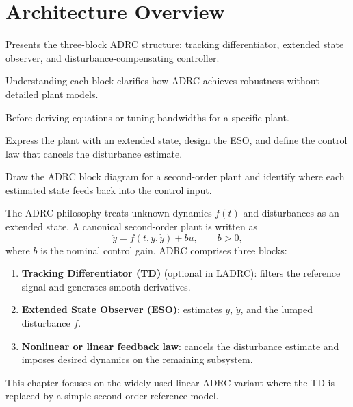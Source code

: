 \section{Architecture Overview}
\begin{beginnerguide}
    \item[\textbf{What?}] Presents the three-block ADRC structure: tracking differentiator, extended state observer, and disturbance-compensating controller.
    \item[\textbf{Why?}] Understanding each block clarifies how ADRC achieves robustness without detailed plant models.
    \item[\textbf{When?}] Before deriving equations or tuning bandwidths for a specific plant.
    \item[\textbf{How?}] Express the plant with an extended state, design the ESO, and define the control law that cancels the disturbance estimate.
    \item[\textbf{Example}] Draw the ADRC block diagram for a second-order plant and identify where each estimated state feeds back into the control input.
\end{beginnerguide}
The ADRC philosophy treats unknown dynamics $f(t)$ and disturbances as an extended state. A canonical second-order plant is written as
\begin{equation}
    \ddot{y} = f(t, y, \dot{y}) + b u, \qquad b > 0,
    \label{eq:adrc-plant}
\end{equation}
where $b$ is the nominal control gain. ADRC comprises three blocks:
\begin{enumerate}[leftmargin=*]
    \item \textbf{Tracking Differentiator (TD)} (optional in LADRC): filters the reference signal and generates smooth derivatives.
    \item \textbf{Extended State Observer (ESO)}: estimates $y$, $\dot{y}$, and the lumped disturbance $f$.
    \item \textbf{Nonlinear or linear feedback law}: cancels the disturbance estimate and imposes desired dynamics on the remaining subsystem.
\end{enumerate}
This chapter focuses on the widely used linear ADRC variant where the TD is replaced by a simple second-order reference model.

